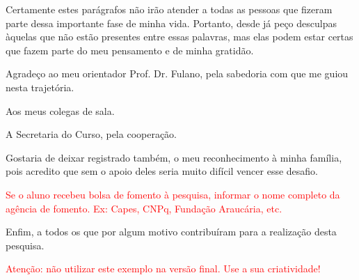 Certamente estes parágrafos não irão atender a todas as pessoas que fizeram parte dessa importante fase de minha vida. Portanto, desde já peço desculpas àquelas que não estão presentes entre essas palavras, mas elas podem estar certas que fazem parte do meu pensamento e de minha gratidão. 

Agradeço ao meu orientador Prof. Dr. Fulano, pela sabedoria com que me guiou nesta trajetória.

Aos meus colegas de sala.

A Secretaria do Curso, pela cooperação.

Gostaria de deixar registrado também, o meu reconhecimento à minha família, pois acredito que sem o apoio deles seria muito difícil vencer esse desafio. 

\textcolor{red}{Se o aluno recebeu bolsa de fomento à pesquisa, informar o nome completo da agência de fomento. Ex: Capes, CNPq, Fundação Araucária, etc.}

Enfim, a todos os que por algum motivo contribuíram para a realização desta pesquisa.

\textcolor{red}{Atenção: não utilizar este exemplo na versão final. Use a sua criatividade!}
